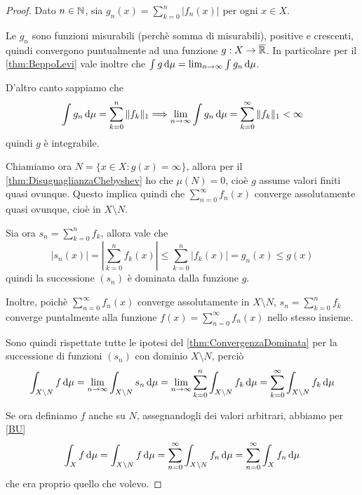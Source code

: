 \begin{proof}
	Dato $n\in \mathbb N$, sia $g_n(x)=\sum_{k=0}^n|f_n(x)|$ per ogni $x\in X$. 
	
	Le $g_n$ sono funzioni misurabili (perchè somma di misurabili), positive e crescenti, quindi convergono puntualmente ad una funzione $g:X\to\overline{\mathbb R}$. In particolare per il \cref{thm:BeppoLevi} vale inoltre che $\int g\,\mathrm d\mu=\lim_{n\to\infty}\int g_n\,\mathrm d\mu$.
	
	D'altro canto sappiamo che 
	\begin{equation*}
		\int g_n\,\mathrm d\mu=\sum_{k=0}^n\Vert  f_k\Vert_1 \Longrightarrow \lim_{n\to\infty}\int g_n\,\mathrm d\mu=\sum_{k=0}^\infty \Vert  f_k\Vert_1<\infty
	\end{equation*}
	quindi $g$ è integrabile.
	
	Chiamiamo ora $N=\{ x\in X:g(x)=\infty\}$, allora per il \cref{thm:DisuguaglianzaChebyshev} ho che $\mu(N)=0$, cioè $g$ assume valori finiti quasi ovunque. Questo implica quindi che $\sum_{n=0}^\infty f_n(x)$ converge assolutamente quasi ovunque, cioè in $X\setminus N$.
	
	Sia ora $s_n=\sum_{k=0}^n f_k$, allora vale che
	\begin{equation*}
		|s_n(x)|=|\sum_{k=0}^n f_k(x)|\le \sum_{k=0}^n |f_k(x)|=g_n(x)\le g(x)
	\end{equation*}
	quindi la successione $(s_n)$ è dominata dalla funzione $g$.
	
	Inoltre, poichè $\sum_{n=0}^\infty f_n(x)$ converge assolutamente in $X\setminus N$, $s_n=\sum_{k=0}^n f_k$ converge puntalmente alla funzione $f(x)=\sum_{n=0}^\infty f_n(x)$ nello stesso insieme.
	
	Sono quindi rispettate tutte le ipotesi del \cref{thm:ConvergenzaDominata} per la successione di funzioni $(s_n)$ con dominio $X\setminus N$, perciò
	\begin{equation*}
		\int_{X\setminus N} f\,\mathrm d\mu=\lim_{n\to\infty}\int_{X\setminus N}s_n\,\mathrm d\mu=\lim_{n\to\infty}\sum_{k=0}^n\int_{X\setminus N}  f_k\,\mathrm d\mu= \sum_{k=0}^\infty\int_{X\setminus N}f_k\,\mathrm d\mu
	\end{equation*}

	Se ora definiamo $f$ anche su $N$, assegnandogli dei valori arbitrari, abbiamo per \cref{BU}
	\begin{equation*}
		\int_X f\,\mathrm d\mu=\int_{X\setminus N} f\,\mathrm d\mu=\sum_{n=0}^\infty\int_{X\setminus N}f_n\,\mathrm d\mu=\sum_{n=0}^\infty\int_X f_n\,\mathrm d\mu
	\end{equation*}
	che era proprio quello che volevo.
\end{proof}








